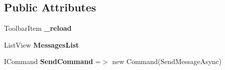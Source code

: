 \subsection*{Public Attributes}
\begin{DoxyCompactItemize}
\item 
Toolbar\+Item {\bfseries \+\_\+reload}
\item 
\mbox{\label{class_tutor_scout24_1_1_view_models_1_1_chat_view_model_ac503da7bebe7201d429be66e0a5b1025}} 
List\+View {\bfseries Messages\+List}
\item 
\mbox{\label{class_tutor_scout24_1_1_view_models_1_1_chat_view_model_a035cc5292afa9270fb67105a58d9cbb4}} 
I\+Command {\bfseries Send\+Command} =$>$ new Command(Send\+Message\+Async)
\end{DoxyCompactItemize}
